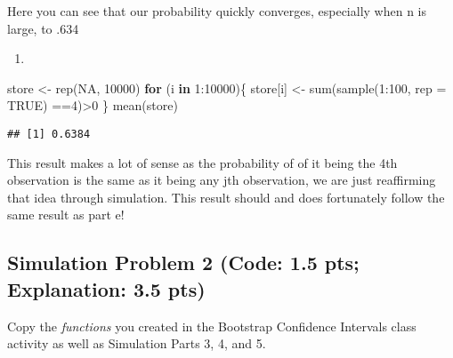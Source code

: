 \documentclass[
]{article}
\newenvironment{Shaded}{\begin{snugshade}}{\end{snugshade}}
\newcommand{\AttributeTok}[1]{\textcolor[rgb]{0.77,0.63,0.00}{#1}}
\newcommand{\ConstantTok}[1]{\textcolor[rgb]{0.00,0.00,0.00}{#1}}
\newcommand{\ControlFlowTok}[1]{\textcolor[rgb]{0.13,0.29,0.53}{\textbf{#1}}}
\newcommand{\DecValTok}[1]{\textcolor[rgb]{0.00,0.00,0.81}{#1}}
\newcommand{\FunctionTok}[1]{\textcolor[rgb]{0.00,0.00,0.00}{#1}}
\newcommand{\NormalTok}[1]{#1}
\newcommand{\OtherTok}[1]{\textcolor[rgb]{0.56,0.35,0.01}{#1}}
\newcommand{\SpecialCharTok}[1]{\textcolor[rgb]{0.00,0.00,0.00}{#1}}
\providecommand{\tightlist}{%
  \setlength{\itemsep}{0pt}\setlength{\parskip}{0pt}}
\begin{document}
Here you can see that our probability quickly converges, especially when
n is large, to .634

\begin{enumerate}
\def\labelenumi{\alph{enumi})}
\setcounter{enumi}{7}
\tightlist
\item
\end{enumerate}

\begin{Shaded}
\begin{Highlighting}[]
\NormalTok{store }\OtherTok{\textless{}{-}} \FunctionTok{rep}\NormalTok{(}\ConstantTok{NA}\NormalTok{, }\DecValTok{10000}\NormalTok{)}
\ControlFlowTok{for}\NormalTok{ (i }\ControlFlowTok{in} \DecValTok{1}\SpecialCharTok{:}\DecValTok{10000}\NormalTok{)\{}
\NormalTok{  store[i] }\OtherTok{\textless{}{-}} \FunctionTok{sum}\NormalTok{(}\FunctionTok{sample}\NormalTok{(}\DecValTok{1}\SpecialCharTok{:}\DecValTok{100}\NormalTok{, }\AttributeTok{rep =} \ConstantTok{TRUE}\NormalTok{) }\SpecialCharTok{==}\DecValTok{4}\NormalTok{)}\SpecialCharTok{\textgreater{}}\DecValTok{0}
\NormalTok{\}}
\FunctionTok{mean}\NormalTok{(store)}
\end{Highlighting}
\end{Shaded}

\begin{verbatim}
## [1] 0.6384
\end{verbatim}

This result makes a lot of sense as the probability of of it being the
4th observation is the same as it being any jth observation, we are just
reaffirming that idea through simulation. This result should and does
fortunately follow the same result as part e!

\hypertarget{simulation-problem-2-code-1.5-pts-explanation-3.5-pts}{%
\subsection{Simulation Problem 2 (Code: 1.5 pts; Explanation: 3.5
pts)}\label{simulation-problem-2-code-1.5-pts-explanation-3.5-pts}}

Copy the \emph{functions} you created in the Bootstrap Confidence
Intervals class activity as well as Simulation Parts 3, 4, and 5.
\end{document}

